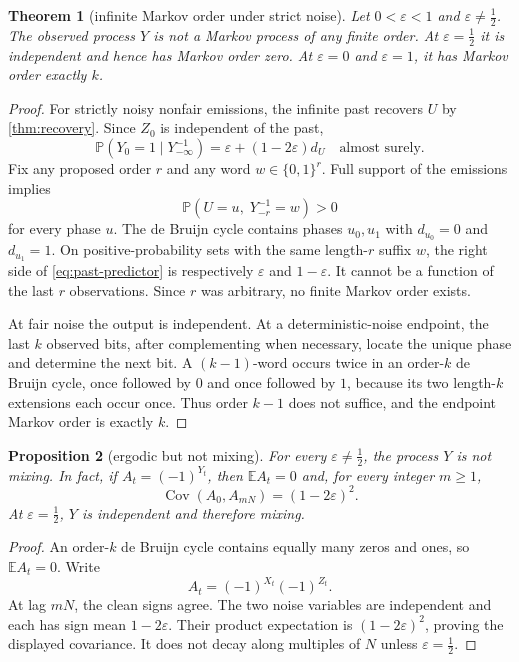 \documentclass[11pt,a4paper]{amsart}
\newtheorem{theorem}{Theorem}[section]
\newtheorem{proposition}[theorem]{Proposition}
\theoremstyle{definition}
\theoremstyle{remark}
\newcommand{\E}{\mathbb E}
\newcommand{\Prob}{\mathbb P}
\begin{document}
\begin{theorem}[infinite Markov order under strict noise]\label{thm:markov}
Let $0<\varepsilon<1$ and $\varepsilon\neq\tfrac12$.  The observed process
$Y$ is not a Markov process of any finite order.  At
$\varepsilon=\tfrac12$ it is independent and hence has Markov order zero.
At $\varepsilon=0$ and $\varepsilon=1$, it has Markov order exactly $k$.
\end{theorem}

\begin{proof}
For strictly noisy nonfair emissions, the infinite past recovers $U$ by
\cref{thm:recovery}.  Since $Z_0$ is independent of the past,
\begin{equation}\label{eq:past-predictor}
 \Prob(Y_0=1\mid Y_{-\infty}^{-1})
 =\varepsilon+(1-2\varepsilon)d_U
 \quad\text{almost surely}.
\end{equation}
Fix any proposed order $r$ and any word $w\in\{0,1\}^r$.  Full support of
the emissions implies
\[
 \Prob(U=u,\;Y_{-r}^{-1}=w)>0
\]
for every phase $u$.  The de Bruijn cycle contains phases $u_0,u_1$ with
$d_{u_0}=0$ and $d_{u_1}=1$.  On positive-probability sets with the same
length-$r$ suffix $w$, the right side of \eqref{eq:past-predictor} is
respectively $\varepsilon$ and $1-\varepsilon$.  It cannot be a function of
the last $r$ observations.  Since $r$ was arbitrary, no finite Markov order
exists.

At fair noise the output is independent.  At a deterministic-noise endpoint,
the last $k$ observed bits, after complementing when necessary, locate the
unique phase and determine the next bit.  A $(k-1)$-word occurs twice in an
order-$k$ de Bruijn cycle, once followed by $0$ and once followed by $1$,
because its two length-$k$ extensions each occur once.  Thus order $k-1$
does not suffice, and the endpoint Markov order is exactly $k$.
\end{proof}

\begin{proposition}[ergodic but not mixing]\label{prop:nonmixing}
For every $\varepsilon\neq\tfrac12$, the process $Y$ is not mixing.  In
fact, if $A_t=(-1)^{Y_t}$, then $\E A_t=0$ and, for every integer $m\geq1$,
\[
 \operatorname{Cov}(A_0,A_{mN})=(1-2\varepsilon)^2.
\]
At $\varepsilon=\tfrac12$, $Y$ is independent and therefore mixing.
\end{proposition}

\begin{proof}
An order-$k$ de Bruijn cycle contains equally many zeros and ones, so
$\E A_t=0$.  Write
\[
 A_t=(-1)^{X_t}(-1)^{Z_t}.
\]
At lag $mN$, the clean signs agree.  The two noise variables are independent
and each has sign mean $1-2\varepsilon$.  Their product expectation is
$(1-2\varepsilon)^2$, proving the displayed covariance.  It does not decay
along multiples of $N$ unless $\varepsilon=\tfrac12$.
\end{proof}
\end{document}
